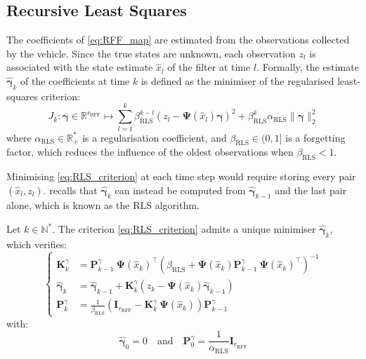\subsection{Recursive Least Squares}

The coefficients of \eqref{eq:RFF_map} are estimated from the observations collected by the vehicle. Since the true states are unknown, each observation $z_l$ is associated with the state estimate $\hat{x}_l$ of the filter at time $l$. Formally, the estimate $\hat{\boldsymbol{\gamma}}_k$ of the coefficients at time $k$ is defined as the minimiser of the regularised least-squares criterion:
\begin{equation}
	J_k:\boldsymbol{\gamma}\in\mathbb{R}^{r_{\mathrm{RFF}}}\mapsto\sum_{l=1}^k\beta_{\mathrm{RLS}}^{k-l}\left(z_l-\boldsymbol{\Psi}\left(\hat{x}_l\right)\boldsymbol{\gamma}\right)^2+\beta_{\mathrm{RLS}}^k\alpha_{\mathrm{RLS}}\|\boldsymbol{\gamma}\|_2^2\label{eq:RLS_criterion}
\end{equation}
where $\alpha_{\mathrm{RLS}}\in\mathbb{R}_+^*$ is a regularisation coefficient, and $\beta_{\mathrm{RLS}}\in(0,1]$ is a forgetting factor, which reduces the influence of the oldest observations when $\beta_{\mathrm{RLS}}<1$.

Minimising \eqref{eq:RLS_criterion} at each time step would require storing every pair $\left(\hat{x}_l,z_l\right)$.  recalls that $\hat{\boldsymbol{\gamma}}_k$ can instead be computed from $\hat{\boldsymbol{\gamma}}_{k-1}$ and the last pair alone, which is known as the RLS algorithm.

\begin{proposition}\label{th:RLS}
	Let $k\in\mathbb{N}^*$. The criterion \eqref{eq:RLS_criterion} admits a unique minimiser $\hat{\boldsymbol{\gamma}}_k$, which verifies:
	\begin{equation}
		\left\{\begin{aligned}
		\mathbf{K}_k^\gamma&=\mathbf{P}_{k-1}^\gamma\:\boldsymbol{\Psi}\left(\hat{x}_k\right)^\top\left(\beta_{\mathrm{RLS}}+\boldsymbol{\Psi}\left(\hat{x}_k\right)\mathbf{P}_{k-1}^\gamma\:\boldsymbol{\Psi}\left(\hat{x}_k\right)^\top\right)^{-1}\\
		\hat{\boldsymbol{\gamma}}_k&=\hat{\boldsymbol{\gamma}}_{k-1}+\mathbf{K}_k^\gamma\left(z_k-\boldsymbol{\Psi}\left(\hat{x}_k\right)\hat{\boldsymbol{\gamma}}_{k-1}\right)\\
		\mathbf{P}_k^\gamma&=\frac{1}{\beta_{\mathrm{RLS}}}\left(\mathbf{I}_{r_{\mathrm{RFF}}}-\mathbf{K}_k^\gamma\:\boldsymbol{\Psi}\left(\hat{x}_k\right)\right)\mathbf{P}_{k-1}^\gamma
		\end{aligned}\right.\label{eq:RLS}
	\end{equation}
	with:
	\begin{equation}
		\hat{\boldsymbol{\gamma}}_0=0\quad\text{and}\quad \mathbf{P}_0^\gamma=\frac{1}{\alpha_{\mathrm{RLS}}}\mathbf{I}_{r_{\mathrm{RFF}}}
	\end{equation}
\end{proposition}

